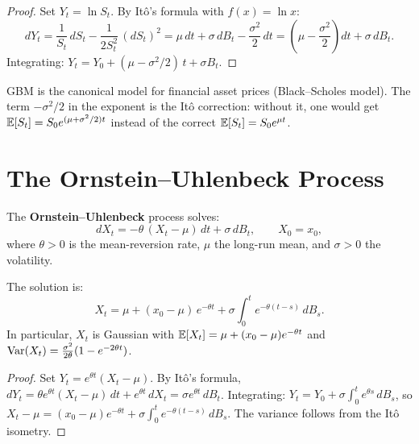 \begin{proof}
Set $Y_t = \ln S_t$. By It\^o's formula with $f(x) = \ln x$:
\[
  dY_t = \frac{1}{S_t}\,dS_t - \frac{1}{2S_t^2}\,(dS_t)^2
  = \mu\,dt + \sigma\,dB_t - \frac{\sigma^2}{2}\,dt
  = \left(\mu - \frac{\sigma^2}{2}\right)dt + \sigma\,dB_t.
\]
Integrating: $Y_t = Y_0 + (\mu - \sigma^2/2)\,t + \sigma B_t$.
\end{proof}

\begin{intuition}
GBM is the canonical model for financial asset prices (Black--Scholes
model). The term $-\sigma^2/2$ in the exponent is the It\^o correction:
without it, one would get $\mathbb{E}[S_t] = S_0 e^{(\mu+\sigma^2/2)t}$ instead
of the correct $\mathbb{E}[S_t] = S_0 e^{\mu t}$.
\end{intuition}

\section{The Ornstein--Uhlenbeck Process}
\label{sec:ou}

\begin{definition}
The \textbf{Ornstein--Uhlenbeck} process solves:
\[
  dX_t = -\theta\,(X_t - \mu)\,dt + \sigma\,dB_t, \qquad X_0 = x_0,
\]
where $\theta > 0$ is the mean-reversion rate, $\mu$ the long-run mean,
and $\sigma > 0$ the volatility.
\end{definition}

\begin{proposition}
The solution is:
\[
  X_t = \mu + (x_0 - \mu)\,e^{-\theta t}
    + \sigma\int_0^t e^{-\theta(t-s)}\,dB_s.
\]
In particular, $X_t$ is Gaussian with $\mathbb{E}[X_t] = \mu + (x_0 - \mu)e^{-\theta t}$
and $\mathrm{Var}(X_t) = \frac{\sigma^2}{2\theta}(1 - e^{-2\theta t})$.
\end{proposition}

\begin{proof}
Set $Y_t = e^{\theta t}(X_t - \mu)$. By It\^o's formula,
$dY_t = \theta e^{\theta t}(X_t - \mu)\,dt + e^{\theta t}\,dX_t
= \sigma e^{\theta t}\,dB_t$.
Integrating: $Y_t = Y_0 + \sigma\int_0^t e^{\theta s}\,dB_s$,
so $X_t - \mu = (x_0 - \mu)e^{-\theta t} + \sigma\int_0^t
e^{-\theta(t-s)}\,dB_s$. The variance follows from the It\^o isometry.
\end{proof}


